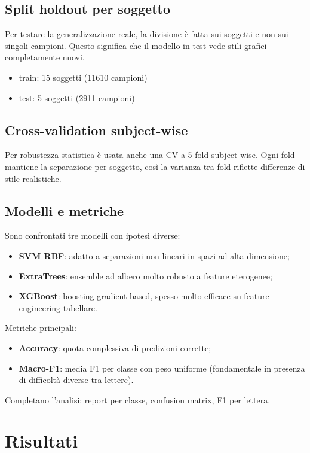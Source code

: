 \documentclass[a4paper,12pt]{article}
\begin{document}
\subsection{Split holdout per soggetto}
Per testare la generalizzazione reale, la divisione è fatta sui soggetti e non sui singoli campioni.
Questo significa che il modello in test vede stili grafici completamente nuovi.

\begin{itemize}[leftmargin=1.5em]
  \item train: 15 soggetti (11610 campioni)
  \item test: 5 soggetti (2911 campioni)
\end{itemize}

\subsection{Cross-validation subject-wise}
Per robustezza statistica è usata anche una CV a 5 fold subject-wise.
Ogni fold mantiene la separazione per soggetto, così la varianza tra fold riflette differenze di stile realistiche.

\subsection{Modelli e metriche}
Sono confrontati tre modelli con ipotesi diverse:
\begin{itemize}[leftmargin=1.5em]
  \item \textbf{SVM RBF}: adatto a separazioni non lineari in spazi ad alta dimensione;
  \item \textbf{ExtraTrees}: ensemble ad albero molto robusto a feature eterogenee;
  \item \textbf{XGBoost}: boosting gradient-based, spesso molto efficace su feature engineering tabellare.
\end{itemize}

Metriche principali:
\begin{itemize}[leftmargin=1.5em]
  \item \textbf{Accuracy}: quota complessiva di predizioni corrette;
  \item \textbf{Macro-F1}: media F1 per classe con peso uniforme (fondamentale in presenza di difficoltà diverse tra lettere).
\end{itemize}

Completano l'analisi: report per classe, confusion matrix, F1 per lettera.

\section{Risultati}
\end{document}
